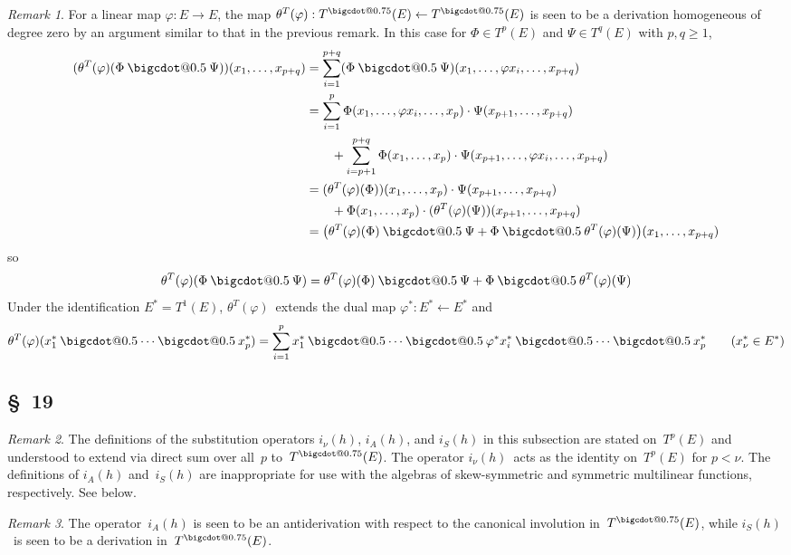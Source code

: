 \documentclass[letterpaper,12pt]{article}
\makeatletter
\newcommand{\from}{\leftarrow}
\newcommand{\bigcdot}[1]{\mathbin{\mathpalette\bigcdot@{#1}}}
\newcommand{\bigcdot@}[2]{%
  \sbox0{$#1\vcenter{}$}%
  \sbox2{$#1\cdot\m@th$}%
  \hbox{%
    \hfil
    \raise\ht0\hbox{%
      \scalebox{#2}{%
        \lower\ht0\hbox{$#1\bullet\m@th$}%
      }%
    }%
    \hfil
  }%
}
\newcommand{\mult}{\cdot}
\newcommand{\fprod}{\bigcdot{0.5}}
\newcommand{\tdot}{\bigcdot{0.75}}
\newcommand{\multi}[4]{#2_{#3}#1\cdots#1#2_{#4}}
\newcommand{\fprods}[3]{\multi{\fprod}{#1}{#2}{#3}}
\theoremstyle{definition}
\theoremstyle{remark}
\newtheorem*{rmk}{Remark}
\makeatother
\begin{document}
\begin{rmk}
For a linear map \(\varphi:E\to E\), the map \(\theta^T(\varphi):T^{\tdot}(E)\from T^{\tdot}(E)\) is seen to be a derivation homogeneous of degree zero by an argument similar to that in the previous remark. In this case for \(\Phi\in T^p(E)\) and \(\Psi\in T^q(E)\) with \(p,q\ge 1\),
\begin{align*}
(\theta^T(\varphi)(\Phi\fprod\Psi))(x_1,\ldots,x_{p+q})&=\sum_{i=1}^{p+q}(\Phi\fprod\Psi)(x_1,\ldots,\varphi x_i,\ldots,x_{p+q})\\
	&=\sum_{i=1}^{p}\Phi(x_1,\ldots,\varphi x_i,\ldots,x_p)\mult\Psi(x_{p+1},\ldots,x_{p+q})\\
	&\qquad+\sum_{i=p+1}^{p+q}\Phi(x_1,\ldots,x_p)\mult\Psi(x_{p+1},\ldots,\varphi x_i,\ldots,x_{p+q})\\
	&=(\theta^T(\varphi)(\Phi))(x_1,\ldots,x_p)\mult\Psi(x_{p+1},\ldots,x_{p+q})\\
	&\qquad+\Phi(x_1,\ldots,x_p)\mult(\theta^T(\varphi)(\Psi))(x_{p+1},\ldots,x_{p+q})\\
	&=\bigl(\theta^T(\varphi)(\Phi)\fprod\Psi+\Phi\fprod\theta^T(\varphi)(\Psi)\bigr)(x_1,\ldots,x_{p+q})
\end{align*}
so
\[\theta^T(\varphi)(\Phi\fprod\Psi)=\theta^T(\varphi)(\Phi)\fprod\Psi+\Phi\fprod\theta^T(\varphi)(\Psi)\]
Under the identification \(E^*=T^1(E)\), \(\theta^T(\varphi)\)~extends the dual map \(\varphi^*:E^*\from E^*\) and
\[\theta^T(\varphi)(\fprods{x^*}{1}{p})=\sum_{i=1}^p x^*_1\fprod\cdots\fprod\varphi^*x^*_i\fprod\cdots\fprod x^*_p\qquad(x^*_{\nu}\in E^*)\]
\end{rmk}

\subsection*{\S~19}
\begin{rmk}
The definitions of the substitution operators \(i_{\nu}(h)\), \(i_A(h)\), and \(i_S(h)\) in this subsection are stated on~\(T^p(E)\) and understood to extend via direct sum over all~\(p\) to~\(T^{\tdot}(E)\). The operator \(i_{\nu}(h)\)~acts as the identity on~\(T^p(E)\) for \(p<\nu\). The definitions of \(i_A(h)\) and~\(i_S(h)\) are inappropriate for use with the algebras of skew-symmetric and symmetric multilinear functions, respectively. See below.
\end{rmk}

\begin{rmk}
The operator~\(i_A(h)\) is seen to be an antiderivation with respect to the canonical involution in~\(T^{\tdot}(E)\), while \(i_S(h)\)~is seen to be a derivation in~\(T^{\tdot}(E)\).
\end{rmk}
\end{document}
